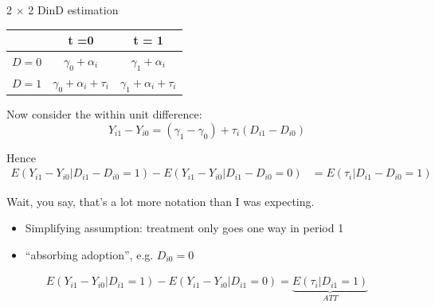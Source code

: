 \documentclass[notes,11pt, aspectratio=169]{beamer}
\newenvironment{wideitemize}{\itemize\addtolength{\itemsep}{10pt}}{\enditemize}
\begin{document}
\begin{frame}{2 $\times$ 2 DinD estimation}
      \begin{center}
        \begin{tabular}{c|cc}
          & t =0 & t = 1\\
          \midrule
          $D = 0$ &  $\gamma_{0} + \alpha_{i}$  & $ \gamma_{1} + \alpha_{i}$\\
          $D = 1$ &  $ \gamma_{0} + \alpha_{i} + \tau_{i} $ & $\gamma_{1} + \alpha_{i} + \tau_{i}$
      \end{tabular}
    \end{center}
    \begin{wideitemize}
    \item Now consider the within unit difference:
      $$Y_{i1} - Y_{i0} = (\gamma_{1} - \gamma_{0}) + \tau_{i}(D_{i1} - D_{i0})$$
    \item Hence 
    \begin{align*}
      E(Y_{i1} - Y_{i0} | D_{i1} - D_{i0} = 1) - E(Y_{i1} - Y_{i0} | D_{i1} - D_{i0} = 0) &= E(\tau_{i}  | D_{i1} - D_{i0} = 1) 
    \end{align*}
  \item Wait, you say, that's a lot more notation than I was expecting.
    \begin{itemize}
    \item Simplifying assumption: treatment only goes one way in
      period 1
    \item  ``absorbing adoption'', e.g. $D_{i0} = 0$
    \end{itemize}
    \begin{align*}
      E(Y_{i1} - Y_{i0} | D_{i1} = 1) - E(Y_{i1} - Y_{i0} | D_{i1} = 0) =  \underbrace{E(\tau_{i}  | D_{i1} = 1) }_{ATT}
    \end{align*}
  \end{wideitemize}
\end{frame}
\end{document}
